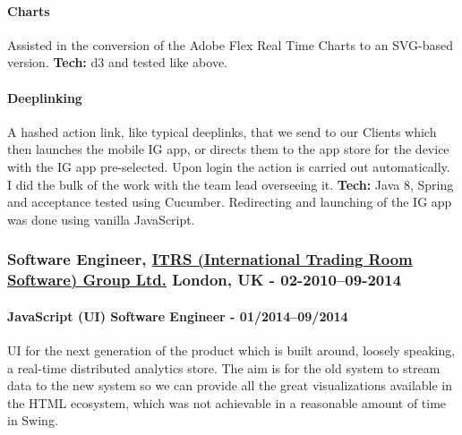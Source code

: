 \documentclass[
  a4paper,
  8pt,
]{article}
\begin{document}
\begin{multicols}{2}
\hypertarget{charts}{%
\paragraph{Charts}\label{charts}}

Assisted in the conversion of the Adobe Flex Real Time Charts to an
SVG-based version. \textbf{Tech:} d3 and tested like above.

\hypertarget{deeplinking}{%
\paragraph{Deeplinking}\label{deeplinking}}

A hashed action link, like typical deeplinks, that we send to our
Clients which then launches the mobile IG app, or directs them to the
app store for the device with the IG app pre-selected. Upon login the
action is carried out automatically. I did the bulk of the work with the
team lead overseeing it. \textbf{Tech:} Java 8, Spring and acceptance
tested using Cucumber. Redirecting and launching of the IG app was done
using vanilla JavaScript.

\hypertarget{software-engineer-itrs-international-trading-room-software-group-ltd.-london-uk---02-201009-2014}{%
\subsubsection{\texorpdfstring{Software Engineer,
\href{https://www.itrsgroup.com}{ITRS (International Trading Room
Software) Group Ltd.} London, UK -
02-2010--09-2014}{Software Engineer, ITRS (International Trading Room Software) Group Ltd. London, UK - 02-2010--09-2014}}\label{software-engineer-itrs-international-trading-room-software-group-ltd.-london-uk---02-201009-2014}}

\hypertarget{javascript-ui-software-engineer---012014092014}{%
\paragraph{JavaScript (UI) Software Engineer -
01/2014--09/2014}\label{javascript-ui-software-engineer---012014092014}}

UI for the next generation of the product which is built around, loosely
speaking, a real-time distributed analytics store. The aim is for the
old system to stream data to the new system so we can provide all the
great visualizations available in the HTML ecosystem, which was not
achievable in a reasonable amount of time in Swing.


\end{multicols}
\end{document}
